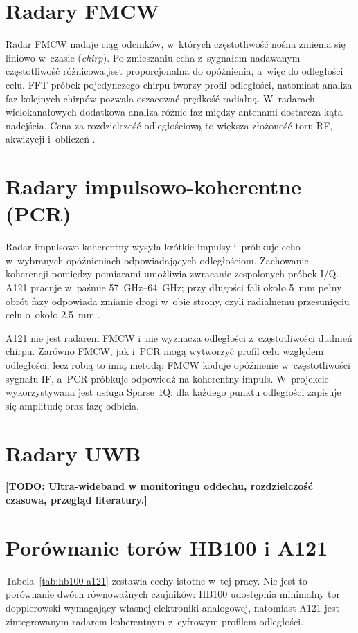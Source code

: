 \documentclass[12pt,a4paper,oneside]{report}
\newcommand{\todo}[1]{\textcolor{red!75!black}{\textbf{[TODO: #1]}}}
\newcommand{\miejsce}[1]{\todo{#1}}
\begin{document}
\section{Radary FMCW}
Radar FMCW nadaje ciąg odcinków, w~których częstotliwość nośna zmienia się
liniowo w~czasie (\emph{chirp}). Po zmieszaniu echa z~sygnałem nadawanym
częstotliwość różnicowa jest proporcjonalna do opóźnienia, a~więc do odległości
celu. FFT próbek pojedynczego chirpu tworzy profil odległości, natomiast analiza
faz kolejnych chirpów pozwala oszacować prędkość radialną. W~radarach
wielokanałowych dodatkowa analiza różnic faz między antenami dostarcza kąta
nadejścia. Cena za rozdzielczość odległościową to większa złożoność toru RF,
akwizycji i~obliczeń \cite{infineon_fmcw}.

\section{Radary impulsowo-koherentne (PCR)}
Radar impulsowo-koherentny wysyła krótkie impulsy i~próbkuje echo w~wybranych
opóźnieniach odpowiadających odległościom. Zachowanie koherencji pomiędzy
pomiarami umożliwia zwracanie zespolonych próbek I/Q. A121 pracuje w~paśmie
\SIrange{57}{64}{GHz}; przy długości fali około \SI{5}{mm} pełny obrót fazy
odpowiada zmianie drogi w~obie strony, czyli radialnemu przesunięciu celu
o~około \SI{2.5}{mm} \cite{acconeer_datasheet,acconeer_sparse_iq}.

A121 nie jest radarem FMCW i~nie wyznacza odległości z~częstotliwości dudnień
chirpu. Zarówno FMCW, jak i~PCR mogą wytworzyć profil celu względem odległości,
lecz robią to inną metodą: FMCW koduje opóźnienie w~częstotliwości sygnału IF,
a~PCR próbkuje odpowiedź na koherentny impuls. W~projekcie wykorzystywana jest
usługa Sparse~IQ: dla każdego punktu odległości zapisuje się amplitudę oraz
fazę odbicia.

\section{Radary UWB}
\miejsce{Ultra-wideband w monitoringu oddechu, rozdzielczość czasowa,
przegląd literatury.}

\section{Porównanie torów HB100 i A121}

Tabela~\ref{tab:hb100-a121} zestawia cechy istotne w~tej pracy. Nie jest to
porównanie dwóch równoważnych czujników: HB100 udostępnia minimalny tor
dopplerowski wymagający własnej elektroniki analogowej, natomiast A121 jest
zintegrowanym radarem koherentnym z~cyfrowym profilem odległości.
\end{document}
